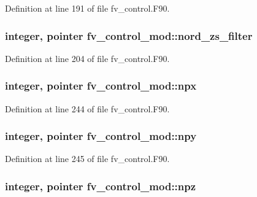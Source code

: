 Definition at line 191 of file fv\-\_\-control.\-F90.

\subsubsection[{nord\-\_\-zs\-\_\-filter}]{\setlength{\rightskip}{0pt plus 5cm}integer, pointer fv\-\_\-control\-\_\-mod\-::nord\-\_\-zs\-\_\-filter\hspace{0.3cm}{\ttfamily [private]}}\label{classfv__control__mod_a9b3efe0ee1171abdffb92d589012c488}


Definition at line 204 of file fv\-\_\-control.\-F90.

\subsubsection[{npx}]{\setlength{\rightskip}{0pt plus 5cm}integer, pointer fv\-\_\-control\-\_\-mod\-::npx\hspace{0.3cm}{\ttfamily [private]}}\label{classfv__control__mod_aa5bfdcfa4bf39b144d7f077526170b15}


Definition at line 244 of file fv\-\_\-control.\-F90.

\subsubsection[{npy}]{\setlength{\rightskip}{0pt plus 5cm}integer, pointer fv\-\_\-control\-\_\-mod\-::npy\hspace{0.3cm}{\ttfamily [private]}}\label{classfv__control__mod_a26b947c94b06e66f76f3e5cc38aa3a16}


Definition at line 245 of file fv\-\_\-control.\-F90.

\subsubsection[{npz}]{\setlength{\rightskip}{0pt plus 5cm}integer, pointer fv\-\_\-control\-\_\-mod\-::npz\hspace{0.3cm}{\ttfamily [private]}}\label{classfv__control__mod_ad0ff6f7684c200055fe2c239b67d1d54}


